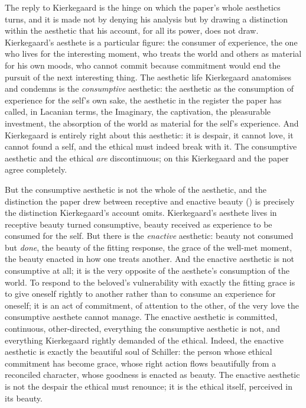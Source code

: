 The reply to Kierkegaard is the hinge on which the paper's whole aesthetics turns, and it is made not by denying his analysis but by drawing a distinction within the aesthetic that his account, for all its power, does not draw. Kierkegaard's aesthete is a particular figure: the consumer of experience, the one who lives for the interesting moment, who treats the world and others as material for his own moods, who cannot commit because commitment would end the pursuit of the next interesting thing. The aesthetic life Kierkegaard anatomises and condemns is the \emph{consumptive} aesthetic: the aesthetic as the consumption of experience for the self's own sake, the aesthetic in the register the paper has called, in Lacanian terms, the Imaginary, the captivation, the pleasurable investment, the absorption of the world as material for the self's experience. And Kierkegaard is entirely right about this aesthetic: it is despair, it cannot love, it cannot found a self, and the ethical must indeed break with it. The consumptive aesthetic and the ethical \emph{are} discontinuous; on this Kierkegaard and the paper agree completely.

But the consumptive aesthetic is not the whole of the aesthetic, and the distinction the paper drew between receptive and enactive beauty () is precisely the distinction Kierkegaard's account omits. Kierkegaard's aesthete lives in receptive beauty turned consumptive, beauty received as experience to be consumed for the self. But there is the \emph{enactive} aesthetic: beauty not consumed but \emph{done}, the beauty of the fitting response, the grace of the well-met moment, the beauty enacted in how one treats another. And the enactive aesthetic is not consumptive at all; it is the very opposite of the aesthete's consumption of the world. To respond to the beloved's vulnerability with exactly the fitting grace is to give oneself rightly to another rather than to consume an experience for oneself; it is an act of commitment, of attention to the other, of the very love the consumptive aesthete cannot manage. The enactive aesthetic is committed, continuous, other-directed, everything the consumptive aesthetic is not, and everything Kierkegaard rightly demanded of the ethical. Indeed, the enactive aesthetic is exactly the beautiful soul of Schiller: the person whose ethical commitment has become grace, whose right action flows beautifully from a reconciled character, whose goodness is enacted as beauty. The enactive aesthetic is not the despair the ethical must renounce; it is the ethical itself, perceived in its beauty.


